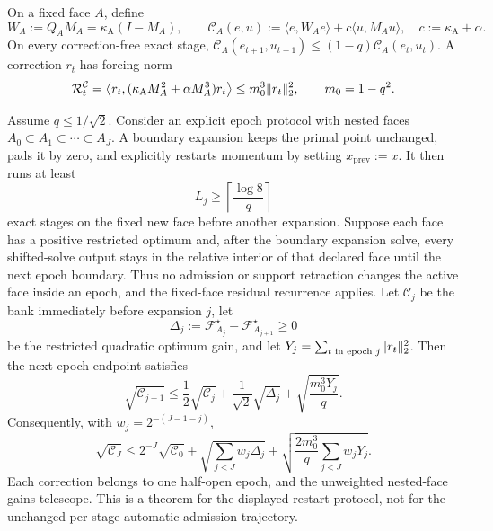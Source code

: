 \begin{proposition}
\label{prop:aesp-cd-moreau-epoch-restart}
On a fixed face $A$, define
\begin{equation}
 W_A:=Q_AM_A=\kappa_{\mathrm A}(I-M_A),
 \qquad
 \mathcal C_A(e,u):=\langle e,W_Ae\rangle
 +c\langle u,M_Au\rangle,
 \quad c:=\kappa_{\mathrm A}+\alpha.
 \label{eq:aesp-cd-moreau-event-bank}
\end{equation}
On every correction-free exact stage,
$\mathcal C_A(e_{t+1},u_{t+1})\leq(1-q)\mathcal C_A(e_t,u_t)$.
A correction $r_t$ has forcing norm
\begin{equation}
 \mathcal R_t^{\mathcal C}
 =\left\langle r_t,
   (\kappa_{\mathrm A}M_A^2+\alpha M_A^3)r_t\right\rangle
 \leq m_0^3\lVert r_t\rVert_2^2,
 \qquad m_0=1-q^2.
 \label{eq:aesp-cd-moreau-event-forcing}
\end{equation}

Assume $q\leq1/\sqrt2$.  Consider an explicit epoch protocol with nested
faces $A_0\subset A_1\subset\cdots\subset A_J$.  A boundary expansion keeps
the primal point unchanged, pads it by zero, and explicitly restarts momentum
by setting $x_{\mathrm{prev}}:=x$.  It then runs at least
\begin{equation*}
 L_j\geq\left\lceil\frac{\log8}{q}\right\rceil
\end{equation*}
exact stages on the fixed new face before another expansion.  Suppose each
face has a positive restricted optimum and, after the boundary expansion
solve, every shifted-solve output stays in the relative interior of that
declared face until the next epoch boundary.  Thus no admission or support
retraction changes the active face inside an epoch, and the fixed-face
residual recurrence applies.  Let $\mathcal C_j$ be the bank immediately
before expansion $j$, let
\begin{equation*}
 \Delta_j:=\mathcal F_{A_j}^\star-\mathcal F_{A_{j+1}}^\star\geq0
\end{equation*}
be the restricted quadratic optimum gain, and let
$Y_j=\sum_{t\text{ in epoch }j}\lVert r_t\rVert_2^2$.  Then the next epoch endpoint
satisfies
\begin{equation}
 \sqrt{\mathcal C_{j+1}}
 \leq\frac12\sqrt{\mathcal C_j}
 +\frac1{\sqrt2}\sqrt{\Delta_j}
 +\sqrt{\frac{m_0^3Y_j}{q}}.
 \label{eq:aesp-cd-moreau-epoch-one-step}
\end{equation}
Consequently, with $w_j=2^{-(J-1-j)}$,
\begin{equation}
 \sqrt{\mathcal C_J}
 \leq2^{-J}\sqrt{\mathcal C_0}
 +\sqrt{\sum_{j<J}w_j\Delta_j}
 +\sqrt{\frac{2m_0^3}{q}\sum_{j<J}w_jY_j}.
 \label{eq:aesp-cd-moreau-epoch-net}
\end{equation}
Each correction belongs to one half-open epoch, and the unweighted nested-face
gains telescope.  This is a theorem for the displayed restart protocol, not
for the unchanged per-stage automatic-admission trajectory.
\end{proposition}

